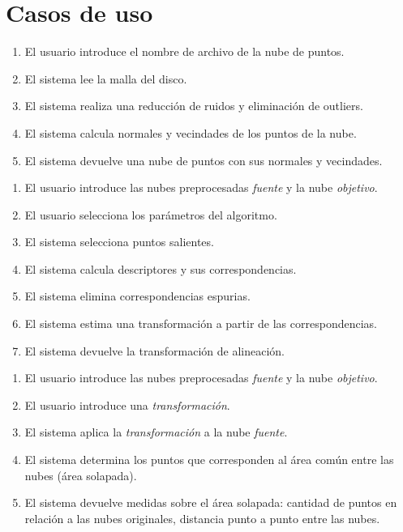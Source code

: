 \chapter{Casos de uso}


		\CUNormal
		\begin{enumerate}
			\item El usuario introduce el nombre de archivo de la nube de puntos.
			\item El sistema lee la malla del disco.
			\item El sistema realiza una reducción de ruidos y eliminación de outliers.
			\item El sistema calcula normales y vecindades de los puntos de la nube.
			\item El sistema devuelve una nube de puntos con sus normales y vecindades.
		\end{enumerate}

		\CUNormal
		\begin{enumerate}
			\item El usuario introduce las nubes preprocesadas \emph{fuente} y la nube \emph{objetivo}. 
			\item El usuario selecciona los parámetros del algoritmo.
			\item El sistema selecciona puntos salientes.
			\item El sistema calcula descriptores y sus correspondencias.
			\item El sistema elimina correspondencias espurias.
			\item El sistema estima una transformación a partir de las correspondencias.
			\item El sistema devuelve la transformación de alineación.
		\end{enumerate}

		\CUNormal
		\begin{enumerate}
			\item El usuario introduce las nubes preprocesadas \emph{fuente} y la nube \emph{objetivo}. 
			\item El usuario introduce una \emph{transformación}.
			\item El sistema aplica la \emph{transformación} a la nube \emph{fuente}.
			\item El sistema determina los puntos que corresponden al área común entre las nubes (área solapada).
			\item El sistema devuelve medidas sobre el área solapada:
				cantidad de puntos en relación a las nubes originales,
				distancia punto a punto entre las nubes.
		\end{enumerate}


